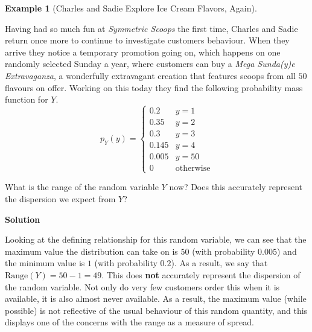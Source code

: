 \documentclass[
  letterpaper,
  DIV=11,
  numbers=noendperiod]{scrreprt}
\theoremstyle{definition}
\theoremstyle{definition}
\newtheorem{example}{Example}[chapter]
\theoremstyle{definition}
\theoremstyle{remark}
\begin{document}
\begin{example}[Charles and Sadie Explore Ice Cream Flavors,
Again]\protect\hypertarget{exm-range-dnw}{}\label{exm-range-dnw}

Having had so much fun at \emph{Symmetric Scoops} the first time,
Charles and Sadie return once more to continue to investigate customers
behaviour. When they arrive they notice a temporary promotion going on,
which happens on one randomly selected Sunday a year, where customers
can buy a \emph{Mega Sunda(y)e Extravaganza}, a wonderfully extravagant
creation that features scoops from all \(50\) flavours on offer. Working
on this today they find the following probability mass function for
\(Y\). \[
p_Y(y) = \begin{cases} 
0.2 & y = 1 \\
0.35 & y = 2 \\
0.3 & y = 3 \\
0.145 & y = 4 \\
0.005 & y = 50 \\
0 & \text{otherwise}
\end{cases}
\]

What is the range of the random variable \(Y\) now? Does this accurately
represent the dispersion we expect from \(Y\)?

\begin{tcolorbox}[enhanced jigsaw, colback=white, colframe=quarto-callout-color-frame, arc=.35mm, leftrule=.75mm, rightrule=.15mm, opacityback=0, breakable, bottomrule=.15mm, left=2mm, toprule=.15mm]

\vspace{-3mm}\textbf{Solution}\vspace{3mm}

Looking at the defining relationship for this random variable, we can
see that the maximum value the distribution can take on is \(50\) (with
probability \(0.005\)) and the minimum value is \(1\) (with probability
\(0.2\)). As a result, we say that \(\text{Range}(Y) = 50 - 1 = 49\).
This does \textbf{not} accurately represent the dispersion of the random
variable. Not only do very few customers order this when it is
available, it is also almost never available. As a result, the maximum
value (while possible) is not reflective of the usual behaviour of this
random quantity, and this displays one of the concerns with the range as
a measure of spread.

\end{tcolorbox}

\end{example}
\end{document}
